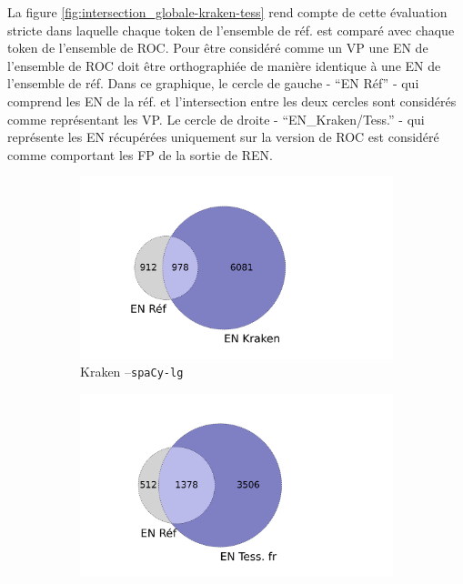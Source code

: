 La figure \ref{fig:intersection_globale-kraken-tess} rend compte de cette évaluation stricte dans laquelle chaque token de l'ensemble de réf. est comparé avec chaque token de l'ensemble de ROC. Pour être considéré comme un VP une EN de l'ensemble de ROC doit être orthographiée de manière identique à une EN de l'ensemble de réf. Dans ce graphique, le cercle de gauche - ``EN Réf'' - qui comprend les EN de la réf. et l'intersection entre les deux cercles sont considérés comme représentant les VP. Le cercle de droite - ``EN\_Kraken/Tess.'' - qui représente les EN récupérées uniquement sur la version de ROC est considéré comme comportant les FP de la sortie de REN. 

\begin{figure}[h!]
    \begin{minipage}{6.5cm}
  \begin{subfigure}{1\textwidth}
  \includegraphics[width=1\textwidth]{IMAGES/INTERSECTIONS_GLOBALES/ELTeCFRA_Kraken_spacy-lg-concat_intersection.png} 
  \caption{Kraken --\texttt{spaCy-lg}}
  \label{fig:ELTeCFRA_Kraken_spacy-lg-concat_intersection}
  \end{subfigure}
  \end{minipage}
  \begin{minipage}{6.5cm}
  \begin{subfigure}{1\textwidth}
  \includegraphics[width=1\textwidth]{IMAGES/INTERSECTIONS_GLOBALES/ELTeCFRA_Tess. fr_spacy-lg-concat_intersection.png}

\end{subfigure}
\end{minipage}
\end{figure}

